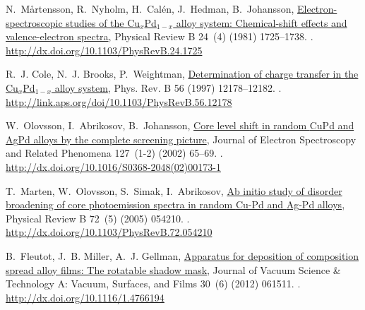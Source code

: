 \documentclass[number, sort&compress, review, 12pt]{elsarticle}
\begin{document}
\begin{thebibliography}{10}
N.~M{\aa}rtensson, R.~Nyholm, H.~Cal\'{e}n, J.~Hedman, B.~Johansson,
  \href{http://dx.doi.org/10.1103/PhysRevB.24.1725}{Electron-spectroscopic
  studies of the {Cu}$_{x}${Pd}$_{1-x}$ alloy system: Chemical-shift effects
  and valence-electron spectra}, Physical Review B 24~(4) (1981) 1725--1738.
\newblock \href {http://dx.doi.org/10.1103/physrevb.24.1725}
  {}.
\newline\urlprefix\url{http://dx.doi.org/10.1103/PhysRevB.24.1725}

R.~J. Cole, N.~J. Brooks, P.~Weightman,
  \href{http://link.aps.org/doi/10.1103/PhysRevB.56.12178}{Determination of
  charge transfer in the {Cu}$_{x}${Pd}$_{1-x}$ alloy system}, Phys. Rev. B 56
  (1997) 12178--12182.
\newblock \href {http://dx.doi.org/10.1103/PhysRevB.56.12178}
  {}.
\newline\urlprefix\url{http://link.aps.org/doi/10.1103/PhysRevB.56.12178}

W.~Olovsson, I.~Abrikosov, B.~Johansson,
  \href{http://dx.doi.org/10.1016/S0368-2048(02)00173-1}{Core level shift in
  random {CuPd} and {AgPd} alloys by the complete screening picture}, Journal
  of Electron Spectroscopy and Related Phenomena 127~(1-2) (2002) 65--69.
\newblock \href {http://dx.doi.org/10.1016/s0368-2048(02)00173-1}
  {}.
\newline\urlprefix\url{http://dx.doi.org/10.1016/S0368-2048(02)00173-1}

T.~Marten, W.~Olovsson, S.~Simak, I.~Abrikosov,
  \href{http://dx.doi.org/10.1103/PhysRevB.72.054210}{Ab initio study of
  disorder broadening of core photoemission spectra in random {Cu-Pd} and
  {Ag-Pd} alloys}, Physical Review B 72~(5) (2005) 054210.
\newblock \href {http://dx.doi.org/10.1103/physrevb.72.054210}
  {}.
\newline\urlprefix\url{http://dx.doi.org/10.1103/PhysRevB.72.054210}

B.~Fleutot, J.~B. Miller, A.~J. Gellman,
  \href{http://dx.doi.org/10.1116/1.4766194}{Apparatus for deposition of
  composition spread alloy films: The rotatable shadow mask}, Journal of Vacuum
  Science \& Technology A: Vacuum, Surfaces, and Films 30~(6) (2012) 061511.
\newblock \href {http://dx.doi.org/10.1116/1.4766194}
  {}.
\newline\urlprefix\url{http://dx.doi.org/10.1116/1.4766194}


\end{thebibliography}
\end{document}
